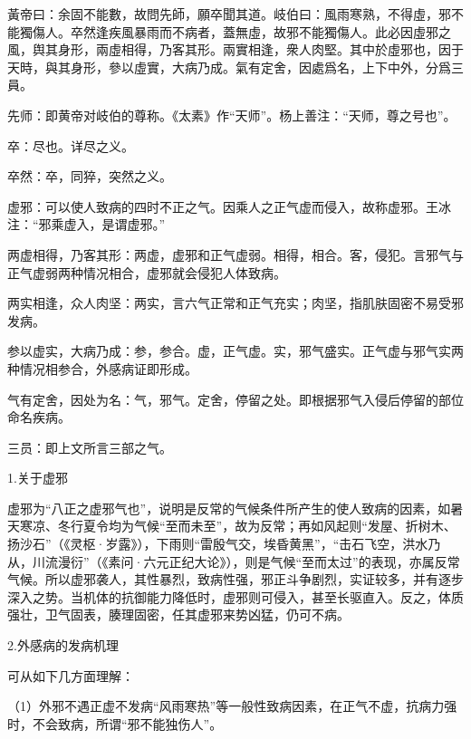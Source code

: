\documentclass[draft,12pt]{ctexbook}
\begin{document}

\begin{yuanwen}
黃帝曰：余固不能數，故問先師，願卒聞其道。岐伯曰：風雨寒熟，不得虛，邪不能獨傷人。卒然逢疾風暴雨而不病者，蓋無虛，故邪不能獨傷人。此必因虛邪之風，舆其身形，兩虛相得，乃客其形。兩實相逢，衆人肉堅。其中於虛邪也，因于天時，與其身形，參以虛實，大病乃成。氣有定舍，因處爲名，上下中外，分爲三員。
\end{yuanwen}


\begin{jiaozhu}
  \item 先师：即黄帝对岐伯的尊称。《太素》作“天师”。杨上善注：“天师，尊之号也”。
  \item 卒：尽也。详尽之义。
  \item 卒然：卒，同猝，突然之义。
  \item 虚邪：可以使人致病的四时不正之气。因乘人之正气虚而侵入，故称虚邪。王冰注：“邪乘虚入，是谓虚邪。”
  \item 两虚相得，乃客其形：两虚，虚邪和正气虚弱。相得，相合。客，侵犯。言邪气与正气虚弱两种情况相合，虚邪就会侵犯人体致病。
  \item 两实相逢，众人肉坚：两实，言六气正常和正气充实；肉坚，指肌肤固密不易受邪发病。
  \item 参以虚实，大病乃成：参，参合。虚，正气虚。实，邪气盛实。正气虚与邪气实两种情况相参合，外感病证即形成。
  \item 气有定舍，因处为名：气，邪气。定舍，停留之处。即根据邪气入侵后停留的部位命名疾病。
  \item 三员：即上文所言三部之气。
\end{jiaozhu}


1.关于虚邪

虚邪为“八正之虚邪气也”，说明是反常的气候条件所产生的使人致病的因素，如暑天寒凉、冬行夏令均为气候“至而未至”，故为反常；再如风起则“发屋、折树木、扬沙石”（《灵枢·岁露》），下雨则“雷殷气交，埃昏黄黑”，“击石飞空，洪水乃从，川流漫衍”（《素问·六元正纪大论》），则是气候“至而太过”的表现，亦属反常气候。所以虚邪袭人，其性暴烈，致病性强，邪正斗争剧烈，实证较多，并有逐步深入之势。当机体的抗御能力降低时，虚邪则可侵入，甚至长驱直入。反之，体质强壮，卫气固表，腠理固密，任其虚邪来势凶猛，仍可不病。

2.外感病的发病机理

可从如下几方面理解：

（1）外邪不遇正虚不发病“风雨寒热”等一般性致病因素，在正气不虚，抗病力强时，不会致病，所谓“邪不能独伤人”。
\end{document}
